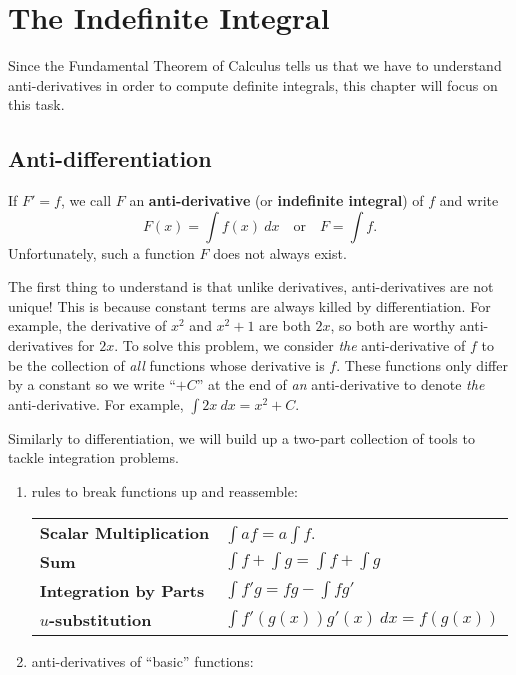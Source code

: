 \section{The Indefinite Integral}

Since the Fundamental Theorem of Calculus tells us that we have to understand anti-derivatives in order to compute definite integrals, this chapter will focus on this task.


\subsection{Anti-differentiation}


If $F'=f$, we call $F$ an \textbf{anti-derivative} (or \textbf{indefinite integral}) of $f$ and write
$$F(x)=\int f(x)\ dx \quad\text{or}\quad F=\int f.$$ 
Unfortunately, such a function $F$ does not always exist. 



The first thing to understand is that unlike derivatives, anti-derivatives are not unique! This is because constant terms are always killed by differentiation. For example, the derivative of $x^2$ and $x^2+1$ are both $2x$, so both are worthy anti-derivatives for $2x$. To solve this problem, we consider \textit{the} anti-derivative of $f$ to be the collection of \textit{all} functions whose derivative is $f$. These functions only differ by a constant so we write ``$+C$'' at the end of \textit{an} anti-derivative to denote \textit{the} anti-derivative. For example, $\int 2x\ dx = x^2+C$.

Similarly to differentiation, we will build up a two-part collection of tools to tackle integration problems.

\begin{enumerate}
\item rules to break functions up and reassemble:

\begin{center}
\def\arraystretch{1.5}
\begin{tabular}{@{}ll@{}}
\toprule[0.4mm]
\textbf{Scalar Multiplication} & $\int a f = a \int f$. \\
\textbf{Sum} & $\int f + \int g= \int f + \int g$ \\
\textbf{Integration by Parts} & $\int f'g = fg - \int fg' $ \\
\textbf{$u$-substitution} & $\int f'(g(x))g'(x)\ dx =  f(g(x))$ \\
\bottomrule[0.4mm]
\end{tabular}
\end{center}

\item anti-derivatives of ``basic'' functions:

\end{enumerate}


